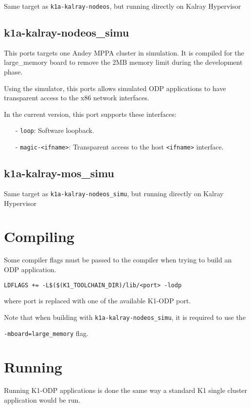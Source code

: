 \documentclass{trkalray}
\begin{document}
Same target as \texttt{k1a-kalray-nodeos}, but running directly on
Kalray Hypervisor

\subsection{k1a-kalray-nodeos\_simu}

This ports targets one Andey MPPA cluster in simulation. It is
compiled for the large\_memory board to remove the 2MB memory limit
during the development phase.

Using the simulator, this ports allows simulated ODP applications to
have transparent access to the x86 network interfaces.

In the current version, this port supports these interfaces:
\begin{itemize}
\item[-]{\texttt{loop}: Software loopback.}
\item[-]{\texttt{magic-<ifname>}: Transparent access to the host
  \texttt{<ifname>} interface.}
\end{itemize}

\subsection{k1a-kalray-mos\_simu}

Same target as \texttt{k1a-kalray-nodeos\_simu}, but running directly on
Kalray Hypervisor

\section{Compiling}

Some compiler flags must be passed to the compiler when trying to
build an ODP application.

\begin{lstlisting}
LDFLAGS += -L$($(K1_TOOLCHAIN_DIR)/lib/<port> -lodp
\end{lstlisting}
where port is replaced with one of the available K1-ODP port.

Note that when building with \texttt{k1a-kalray-nodeos\_simu}, it is
required to use the

 \texttt{-mboard=large\_memory} flag.

\section{Running}

Running K1-ODP applications is done the same way a standard K1 single
cluster application would be run.
\end{document}
